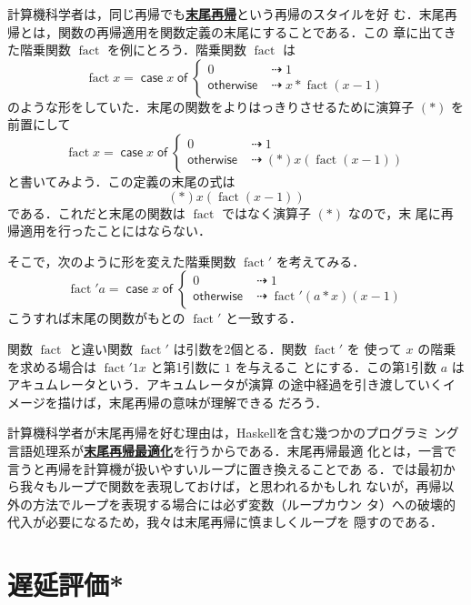 \documentclass[a5paper,twoside,fleqn,draft]{jsbook}
\newcommand{\programminglanguage}[1]{\textsf{#1}}
\newcommand{\haskell}{\programminglanguage{Haskell}}
\newcommand{\keyword}[1]{{\underline{\textbf{#1}}}}
\newcommand{\mKeyword}[1]{\mathsf{#1}} %
\newcommand{\mCaseKeyword}{\mKeyword{case}}
\newcommand{\mOfKeyword}{\mKeyword{of}}
\newcommand{\mOtherwiseKeyword}{\mKeyword{otherwise}}
\DeclareMathOperator{\mCaseKW}{\mCaseKeyword} %
\DeclareMathOperator{\mOfKW}{\mOfKeyword} %
\DeclareMathOperator{\mOtherwise}{\mOtherwiseKeyword}
\newcommand{\mSpecialFunc}[1]{\mathrm{#1}}
\DeclareMathOperator{\mFact}{\mSpecialFunc{fact}}
\DeclareMathOperator{\mIfSo}{\dashrightarrow}
\newcommand{\mCaseOf}[1]{\mCaseKW#1\mOfKW}
\begin{document}
計算機科学者は，同じ再帰でも\keyword{末尾再帰}という再帰のスタイルを好
む．末尾再帰とは，関数の再帰適用を関数定義の末尾にすることである．この
章に出てきた階乗関数 $\mFact$ を例にとろう．階乗関数 $\mFact$ は
\begin{equation}
  \mFact x=\mCaseOf{x}\begin{cases}
    0&\mIfSo1\\
    \mOtherwise&\mIfSo x*\mFact(x-1)
  \end{cases}
\end{equation}
のような形をしていた．末尾の関数をよりはっきりさせるために演算子 $(*)$
を前置にして
\begin{equation}
  \mFact x=\mCaseOf{x}\begin{cases}
    0&\mIfSo1\\
    \mOtherwise&\mIfSo(*)x(\mFact(x-1))
  \end{cases}
\end{equation}
と書いてみよう．この定義の末尾の式は
\begin{equation}
  (*)x(\mFact(x-1))
\end{equation}
である．これだと末尾の関数は $\mFact$ ではなく演算子 $(*)$ なので，末
尾に再帰適用を行ったことにはならない．

そこで，次のように形を変えた階乗関数 $\mFact'$ を考えてみる．
\begin{equation}
  \mFact' a=\mCaseOf{x}\begin{cases}
    0&\mIfSo1\\
    \mOtherwise&\mIfSo\mFact'(a*x)(x-1)
  \end{cases}
\end{equation}
こうすれば末尾の関数がもとの $\mFact'$ と一致する．

関数 $\mFact$ と違い関数 $\mFact'$ は引数を2個とる．関数 $\mFact'$ を
使って $x$ の階乗を求める場合は $\mFact'1x$ と第1引数に $1$ を与えるこ
とにする．この第1引数 $a$ はアキュムレータという．アキュムレータが演算
の途中経過を引き渡していくイメージを描けば，末尾再帰の意味が理解できる
だろう．

計算機科学者が末尾再帰を好む理由は，\haskell を含む幾つかのプログラミ
ング言語処理系が\keyword{末尾再帰最適化}を行うからである．末尾再帰最適
化とは，一言で言うと再帰を計算機が扱いやすいループに置き換えることであ
る．では最初から我々もループで関数を表現しておけば，と思われるかもしれ
ないが，再帰以外の方法でループを表現する場合には必ず変数（ループカウン
  タ）への破壊的代入が必要になるため，我々は末尾再帰に慎ましくループを
隠すのである．

\section{遅延評価*}
\end{document}
